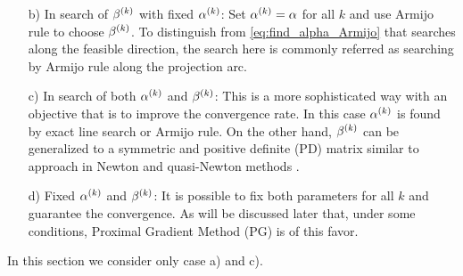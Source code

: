 \begin{itemize}
    \item [b)] In search of $\beta^{(k)}$ with fixed $\alpha^{(k)}$: \newline
               Set $\alpha^{(k)} = \alpha$ for all $k$ and use Armijo rule
               to choose $\beta^{(k)}$.
               To distinguish from \eqref{eq:find_alpha_Armijo} that searches
               along the feasible direction, the search here is commonly
               referred as searching by Armijo rule along the projection arc.
    \item [c)] In search of both $\alpha^{(k)}$ and $\beta^{(k)}$: \newline
               This is a more sophisticated way with an objective that is to
               improve the convergence rate.
               In this case $\alpha^{(k)}$ is found by exact line search or
               Armijo rule.
               On the other hand, $\beta^{(k)}$ can be generalized to a
               symmetric and positive definite (PD) matrix similar to
               approach in Newton and quasi-Newton methods
               \cite{MAX_QUAD_HILLCLIMB,
                     QUASI_NEWTON_METHODS_MOTIV_METHODS}.
    \item [d)] Fixed $\alpha^{(k)}$ and $\beta^{(k)}$: \newline
               It is possible to fix both parameters for all $k$ and guarantee
               the convergence.
               As will be discussed later that, under some conditions, Proximal
               Gradient Method (PG) is of this favor.
\end{itemize}
In this section we consider only case a) and c).

